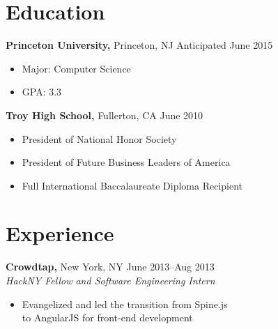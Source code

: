 \documentclass[margin]{res}
\begin{document}

\address{{\bf Present Address} \\ 3169 Frist Center \\
  Princeton, NJ 08544 }

\address{
  dan@dskang.com \\ 
  http://dskang.com \\
  github.com/dskang }

\begin{resume}

\section{Education}
 {\bf Princeton University,} Princeton, NJ \hfill Anticipated June
 2015
 \begin{itemize} \itemsep -2pt %
 \item Major: Computer Science
 \item GPA: 3.3
 \end{itemize}

 {\bf Troy High School,} Fullerton, CA \hfill June 2010
 \begin{itemize} \itemsep -2pt %
 \item President of National Honor Society
 \item President of Future Business Leaders of America
 \item Full International Baccalaureate Diploma Recipient
 \end{itemize}

\section{Experience}
 {\bf Crowdtap,} New York, NY \hfill June 2013--Aug 2013 \\
 {\it HackNY Fellow and Software Engineering Intern}
 \begin{itemize} \itemsep -2pt  %
 \item Evangelized and led the transition from Spine.js \\
   to AngularJS for front-end development
 \end{itemize}



\end{resume}
\end{document}
